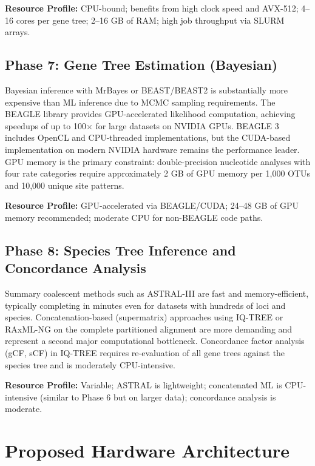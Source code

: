 \textbf{Resource Profile:} CPU-bound; benefits from high clock speed and AVX-512; 4--16 cores per gene tree; 2--16 GB of RAM; high job throughput via SLURM arrays.

\subsection{Phase 7: Gene Tree Estimation (Bayesian)}

Bayesian inference with MrBayes \parencite{ronquist2012} or BEAST/BEAST2 \parencite{bouckaert2019} is substantially more expensive than ML inference due to MCMC sampling requirements. The BEAGLE library \parencite{ayres2019} provides GPU-accelerated likelihood computation, achieving speedups of up to 100$\times$ for large datasets on NVIDIA GPUs. BEAGLE 3 includes OpenCL and CPU-threaded implementations, but the CUDA-based implementation on modern NVIDIA hardware remains the performance leader. GPU memory is the primary constraint: double-precision nucleotide analyses with four rate categories require approximately 2 GB of GPU memory per 1,000 OTUs and 10,000 unique site patterns.

\textbf{Resource Profile:} GPU-accelerated via BEAGLE/CUDA; 24--48 GB of GPU memory recommended; moderate CPU for non-BEAGLE code paths.

\subsection{Phase 8: Species Tree Inference and Concordance Analysis}

Summary coalescent methods such as ASTRAL-III \parencite{zhang2018} are fast and memory-efficient, typically completing in minutes even for datasets with hundreds of loci and species. Concatenation-based (supermatrix) approaches using IQ-TREE or RAxML-NG on the complete partitioned alignment are more demanding and represent a second major computational bottleneck. Concordance factor analysis (gCF, sCF) in IQ-TREE requires re-evaluation of all gene trees against the species tree and is moderately CPU-intensive.

\textbf{Resource Profile:} Variable; ASTRAL is lightweight; concatenated ML is CPU-intensive (similar to Phase 6 but on larger data); concordance analysis is moderate.

\section{Proposed Hardware Architecture}

